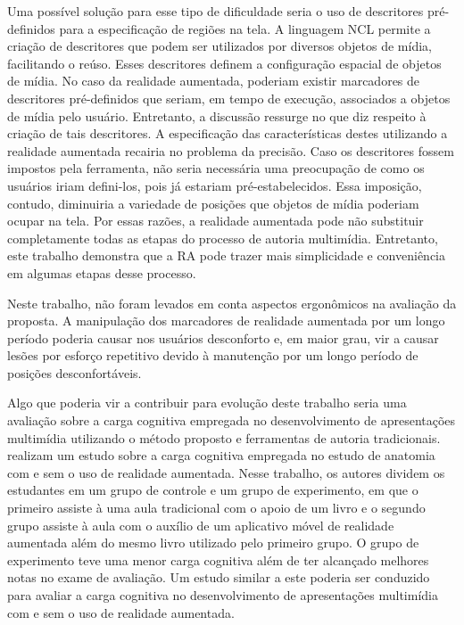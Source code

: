 \documentclass[../main.tex]{subfiles}
\begin{document}
Uma possível solução para esse tipo de dificuldade seria o uso de descritores pré-definidos para a especificação de regiões na tela. A linguagem NCL permite a criação de descritores que podem ser utilizados por diversos objetos de mídia, facilitando o reúso. Esses descritores definem a configuração espacial de objetos de mídia. No caso da realidade aumentada, poderiam existir marcadores de descritores pré-definidos que seriam, em tempo de execução, associados a objetos de mídia pelo usuário. Entretanto, a discussão ressurge no que diz respeito à criação de tais descritores. A especificação das características destes utilizando a realidade aumentada recairia no problema da precisão. Caso os descritores fossem impostos pela ferramenta, não seria necessária uma preocupação de como os usuários iriam defini-los, pois já estariam pré-estabelecidos. Essa imposição, contudo, diminuiria a variedade de posições que objetos de mídia poderiam ocupar na tela. Por essas razões, a realidade aumentada pode não substituir completamente todas as etapas do processo de autoria multimídia. Entretanto, este trabalho demonstra que a RA pode trazer mais simplicidade e conveniência em algumas etapas desse processo.

Neste trabalho, não foram levados em conta aspectos ergonômicos na avaliação da proposta. A manipulação dos marcadores de realidade aumentada por um longo período poderia causar nos usuários desconforto e, em maior grau, vir a causar lesões por esforço repetitivo devido à manutenção por um longo período de posições desconfortáveis.

Algo que poderia vir a contribuir para evolução deste trabalho seria uma avaliação sobre a carga cognitiva empregada no desenvolvimento de apresentações multimídia utilizando o método proposto e ferramentas de autoria tradicionais.  realizam um estudo sobre a carga cognitiva empregada no estudo de anatomia com e sem o uso de realidade aumentada. Nesse trabalho, os autores dividem os estudantes em um grupo de controle e um grupo de experimento, em que o primeiro assiste à uma aula tradicional com o apoio de um livro e o segundo grupo assiste à aula com o auxílio de um aplicativo móvel de realidade aumentada além do mesmo livro utilizado pelo primeiro grupo. O grupo de experimento teve uma menor carga cognitiva além de ter alcançado melhores notas no exame de avaliação. Um estudo similar a este poderia ser conduzido para avaliar a carga cognitiva no desenvolvimento de apresentações multimídia com e sem o uso de realidade aumentada.
\end{document}
